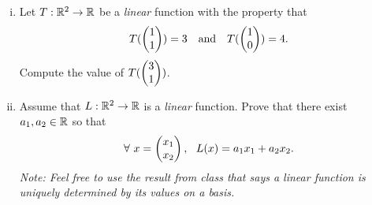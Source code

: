\begin{question}
	\normalfont
	
	
	\begin{enumerate}[(i)]
		\item Let $T:{\mathbb R}^2\to{\mathbb R}$ be a \emph{linear} function with the property that
		\begin{align*}
			T(\ColVecTwo{1}{1}) = 3\ \ \ \text{and}\ \ \ 
			T(\ColVecTwo{1}{0}) = 4.
		\end{align*}
		Compute the value of $T(\begin{pmatrix} 3\\ 1\end{pmatrix})$.
		
		\item Assume that $L:{\mathbb R}^2\to{\mathbb R}$ is a \emph{linear} function.  Prove that there exist $a_1,a_2\in{\mathbb R}$ so that 
		\begin{align*}
			\forall\ x=\begin{pmatrix} x_1\\ x_2\end{pmatrix},\ \ L(x) = a_1x_1 + a_2x_2.
		\end{align*}
		\emph{Note: Feel free to use the result from class that says a linear function is uniquely determined by its values on a basis.}
	\end{enumerate}
\end{question}